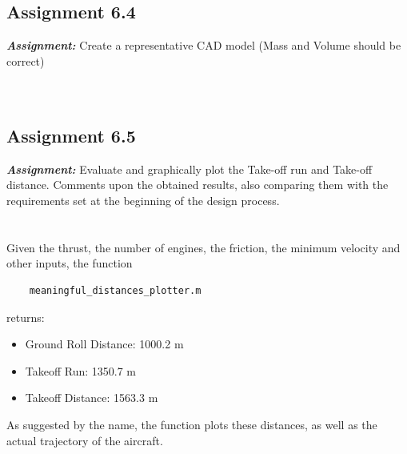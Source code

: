 \documentclass{article}
\begin{document}
\clearpage




\subsection{Assignment 6.4\label{Assignment_6.4}}

\textbf{\textit{Assignment:}} Create a representative CAD model 
(Mass and Volume should be correct) \\ \\ \\ 

\clearpage





\subsection{Assignment 6.5\label{Assignment_6.5}}

\textbf{\textit{Assignment:}} Evaluate and graphically plot the Take-off run and Take-off distance.
Comments upon the obtained results, also comparing them 
with the requirements set at the beginning of the design process. \\ \\ \\ 

Given the thrust, the number of engines, the friction, the minimum velocity and other inputs, the function \autocite{Airbus_replacement_repo}

\begin{verbatim}
    meaningful_distances_plotter.m
\end{verbatim}

returns:

\begin{itemize}
    \item Ground Roll Distance: 1000.2 m
    \item Takeoff Run: 1350.7 m
    \item Takeoff Distance: 1563.3 m
\end{itemize}

As suggested by the name, the function plots these distances, as well as the actual trajectory of the aircraft. \\ 
\end{document}
